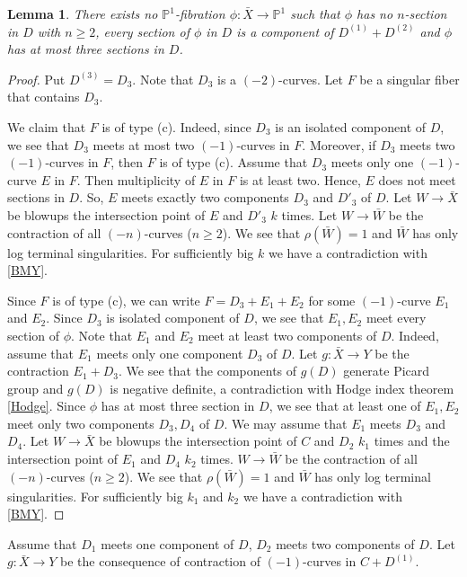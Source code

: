 \documentclass[10pt,oneside,reqno]{amsart}
\newcommand{\pp}{\mathbb{P}}
\newtheorem{lemma}[theorem]{Lemma}
\theoremstyle{definition}
\theoremstyle{remark}
\numberwithin{equation}{section}
\begin{document}
\begin{lemma}
\label{CaseDD-1}
There exists no  $\pp^1$-fibration $\phi\colon\bar{X}\rightarrow\pp^1$ such that $\phi$ has no $n$-section  in $D$ with $n\geq 2$, every section of $\phi$ in $D$ is a component of $D^{(1)}+D^{(2)}$ and $\phi$ has at most three sections in $D$.
\end{lemma}

\begin{proof}
Put $D^{(3)}=D_3$. Note that $D_3$ is a $(-2)$-curves. Let $F$ be a singular fiber that contains $D_3$.


We claim that $F$ is of type (c). Indeed, since $D_3$ is an isolated component of $D$, we see that $D_3$ meets at most two $(-1)$-curves in $F$. Moreover, if $D_3$ meets two $(-1)$-curves in $F$, then $F$ is of type (c). Assume that $D_3$ meets only one $(-1)$-curve $E$ in $F$. Then multiplicity of $E$ in $F$ is at least two. Hence, $E$ does not meet sections in $D$. So, $E$ meets exactly two components $D_3$ and $D'_3$ of $D$. Let $W\rightarrow\bar{X}$ be blowups the intersection point of $E$ and $D'_3$ $k$ times. Let $W\rightarrow\bar{W}$ be the contraction of all $(-n)$-curves ($n\geq 2$). We see that $\rho(\bar{W})=1$ and $\bar{W}$ has only log terminal singularities. For sufficiently big $k$ we have a contradiction with \ref{BMY}.


Since $F$ is of type (c),  we can write  $F=D_3+E_1+E_2$ for some $(-1)$-curve $E_1$ and $E_2$. Since $D_3$ is isolated component of $D$, we see that $E_1, E_2$ meet every section of $\phi$. Note that $E_1$ and $E_2$ meet at least two components of $D$. Indeed, assume that $E_1$ meets only one component $D_3$ of $D$. Let $g\colon\bar{X}\rightarrow Y$ be the contraction $E_1+D_3$. We see that the components of $g(D)$ generate Picard group and $g(D)$ is negative definite, a contradiction with Hodge index theorem \ref{Hodge}. Since $\phi$ has at most three section in $D$, we see that at least one of $E_1, E_2$ meet only two components $D_3, D_4$ of $D$. We may assume that $E_1$ meets $D_3$ and $D_4$. Let $W\rightarrow\bar{X}$ be blowups the intersection point of $C$ and $D_2$ $k_1$ times and the intersection point of $E_1$ and $D_4$ $k_2$ times. $W\rightarrow\bar{W}$ be the contraction of all $(-n)$-curves ($n\geq 2$). We see that $\rho(\bar{W})=1$ and $\bar{W}$ has only log terminal singularities. For sufficiently big $k_1$ and $k_2$ we have a contradiction with \ref{BMY}.
\end{proof}

Assume that $D_1$ meets one component of $D$, $D_2$ meets two components of $D$. Let $g\colon\bar{X}\rightarrow Y$ be the consequence of contraction of $(-1)$-curves in $C+D^{(1)}$.
\end{document}
